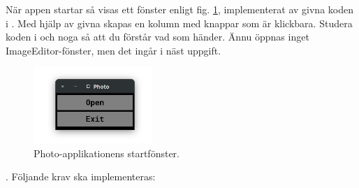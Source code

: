 När appen startar så visas ett fönster enligt fig. \ref{photo:fig:main-window}, implementerat av givna koden i . Med hjälp av givna  skapas en kolumn med knappar som är klickbara. Studera koden i  och  noga så att du förstår vad som händer. Ännu öppnas inget ImageEditor-fönster, men det ingår i näst uppgift.

\begin{figure}[H]
\centering
\includegraphics[width=0.4\textwidth]{../img/w12-assignment-photo/photo-main.png}
\caption{Photo-applikationens startfönster.}
\label{photo:fig:main-window}
\end{figure}

\Task \textbf{}. Följande krav ska implementeras: 

